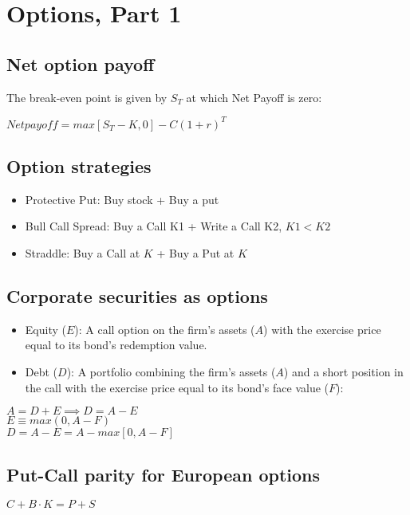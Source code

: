 \section{Options, Part 1}


\subsection*{Net option payoff}

The break-even point is given by $S_T$ at which Net Payoff is zero:

$Net payoff = max[S_T-K,0]-C(1+r)^T $


\subsection*{Option strategies}

\begin{itemize}
	\item Protective Put: Buy stock + Buy a put
	\item Bull Call Spread: Buy a Call K1 + Write a Call K2, $K1<K2$
	\item Straddle: Buy a Call at $K$ + Buy a Put at $K$
\end{itemize} 

\subsection*{Corporate securities as options}
\begin{itemize}
	\item Equity ($E$): A call option on the firm’s assets ($A$) with the exercise price
	equal to its bond’s redemption value.
	\item Debt ($D$): A portfolio combining the firm’s assets ($A$) and a short position in
	the call with the exercise price equal to its bond’s face value ($F$):
	
\end{itemize}


$ A = D+E \implies D=A-E$ \\
$ E \equiv max(0,A-F) $ \\
$ D=A-E=A-max[0,A-F]$

\subsection*{Put-Call parity for European options}

$ C + B \cdot K = P + S$


